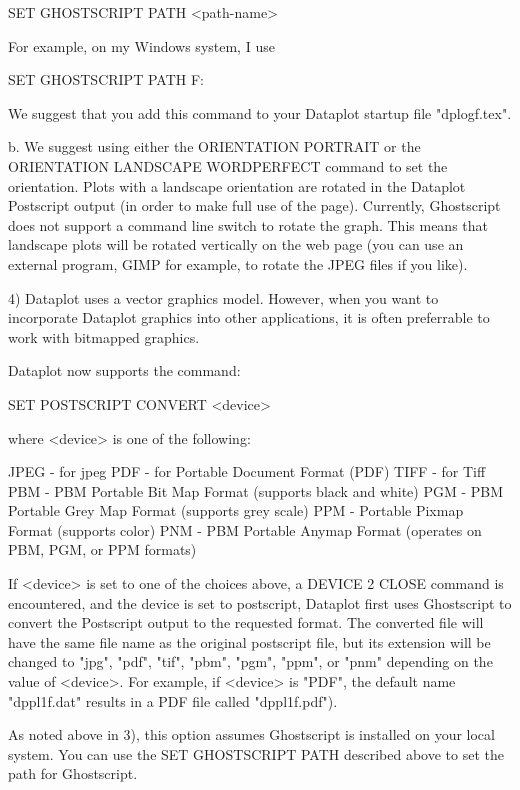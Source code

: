 {           SET GHOSTSCRIPT PATH  <path-name>

       For example, on my Windows system, I use

           SET GHOSTSCRIPT PATH F:\GS{}\GS\BIN\

       We suggest that you add this command to your Dataplot
       startup file "dplogf.tex".

    b. We suggest using either the ORIENTATION PORTRAIT or the
       ORIENTATION LANDSCAPE WORDPERFECT command to set the
       orientation.  Plots with a landscape orientation are
       rotated in the Dataplot Postscript output (in order to
       make full use of the page).  Currently, Ghostscript does
       not support a command line switch to rotate the graph.
       This means that landscape plots will be rotated vertically
       on the web page (you can use an external program, GIMP for
       example, to rotate the JPEG files if you like).

 4) Dataplot uses a vector graphics model.  However, when you want
    to incorporate Dataplot graphics into other applications, it
    is often preferrable to work with bitmapped graphics.

    Dataplot now supports the command:

        SET POSTSCRIPT CONVERT <device>

    where <device> is one of the following:

        JPEG  - for jpeg
        PDF   - for Portable Document Format (PDF)
        TIFF  - for Tiff
        PBM   - PBM Portable Bit Map Format (supports black and white)
        PGM   - PBM Portable Grey Map Format (supports grey scale)
        PPM   - Portable Pixmap Format (supports color)
        PNM   - PBM Portable Anymap Format (operates on PBM, PGM, or
                PPM formats)

    If <device> is set to one of the choices above, a DEVICE 2 CLOSE
    command is encountered, and the device is set to postscript, Dataplot
    first uses Ghostscript to convert the Postscript output to the
    requested format.  The converted file will have the same file name
    as the original postscript file, but its extension will be changed to
    "jpg", "pdf", "tif", "pbm", "pgm", "ppm", or "pnm" depending on
    the value of <device>.  For example, if <device> is "PDF", the default
    name "dppl1f.dat" results in a PDF file called "dppl1f.pdf").

    As noted above in 3), this option assumes Ghostscript is installed
    on your local system.  You can use the SET GHOSTSCRIPT PATH
    described above to set the path for Ghostscript.

}

